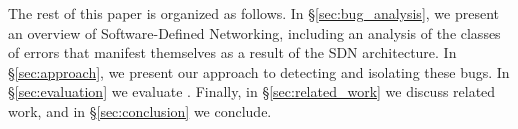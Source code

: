 The rest of this paper is organized as follows. In \S\ref{sec:bug_analysis},
we present an overview of Software-Defined Networking, including an analysis
of the classes of errors that manifest themselves as a result of the SDN architecture.
In \S\ref{sec:approach}, we present our approach to
detecting and isolating these bugs. In \S\ref{sec:evaluation} we evaluate \projectname{}.
Finally, in \S\ref{sec:related_work} we discuss related work, and in \S\ref{sec:conclusion} we conclude.

